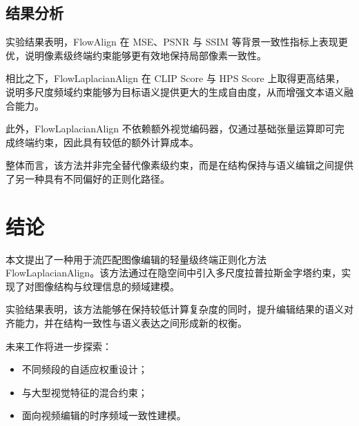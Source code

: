 \documentclass[11pt,a4paper]{ctexart}
\numberwithin{equation}{section}
\begin{document}
\subsection{结果分析}

实验结果表明，FlowAlign 在 MSE、PSNR 与 SSIM 等背景一致性指标上表现更优，说明像素级终端约束能够更有效地保持局部像素一致性。

相比之下，FlowLaplacianAlign 在 CLIP Score 与 HPS Score 上取得更高结果，说明多尺度频域约束能够为目标语义提供更大的生成自由度，从而增强文本语义融合能力。

此外，FlowLaplacianAlign 不依赖额外视觉编码器，仅通过基础张量运算即可完成终端约束，因此具有较低的额外计算成本。

整体而言，该方法并非完全替代像素级约束，而是在结构保持与语义编辑之间提供了另一种具有不同偏好的正则化路径。

\section{结论}

本文提出了一种用于流匹配图像编辑的轻量级终端正则化方法 FlowLaplacianAlign。该方法通过在隐空间中引入多尺度拉普拉斯金字塔约束，实现了对图像结构与纹理信息的频域建模。

实验结果表明，该方法能够在保持较低计算复杂度的同时，提升编辑结果的语义对齐能力，并在结构一致性与语义表达之间形成新的权衡。

未来工作将进一步探索：

\begin{itemize}
    \item 不同频段的自适应权重设计；
    \item 与大型视觉特征的混合约束；
    \item 面向视频编辑的时序频域一致性建模。
\end{itemize}


\end{document}
